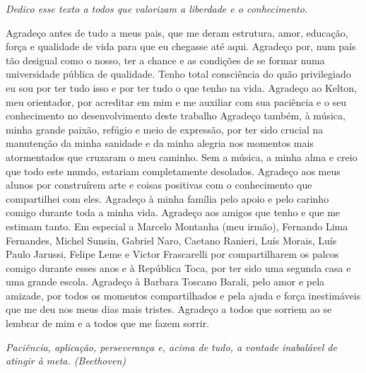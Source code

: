 \documentclass[
	12pt,				%
	openright,			%
	oneside,			%
	a4paper,			%
	english,			%
	french,				%
	spanish,			%
	brazil				%
	]{abntex2}
\begin{document}
\begin{dedicatoria}
   \vspace*{\fill}
   \begin{flushright}
   		\textit{Dedico esse texto a todos que valorizam a liberdade e o conhecimento.}
   \end{flushright}
\end{dedicatoria}

\begin{agradecimentos}
Agradeço antes de tudo a meus pais, que me deram estrutura, amor, educação,
força e qualidade de vida para que eu chegasse até aqui. Agradeço por, num país
tão desigual como o nosso, ter a chance e as condições de se formar numa
universidade pública de qualidade. Tenho total consciência do quão privilegiado
eu sou por ter tudo isso e por ter tudo o que tenho na vida. Agradeço ao Kelton,
meu orientador, por acreditar em mim e me auxiliar com sua paciência e o seu
conhecimento no desenvolvimento deste trabalho Agradeço também, à música, minha
grande paixão, refúgio e meio de expressão, por ter sido crucial na manutenção
da minha sanidade e da minha alegria nos momentos mais atormentados que cruzaram
o meu caminho. Sem a música, a minha alma e creio que todo este mundo, estariam
completamente desolados. Agradeço aos meus alunos por construírem arte e coisas
positivas com o conhecimento que compartilhei com eles. Agradeço à minha família
pelo apoio e pelo carinho comigo durante toda a minha vida. Agradeço aos amigos
que tenho e que me estimam tanto. Em especial a Marcelo Montanha (meu irmão),
Fernando Lima Fernandes, Michel Sunsin, Gabriel Naro, Caetano Ranieri, Luís
Morais, Luís Paulo Jarussi, Felipe Leme e Victor Frascarelli por compartilharem
os palcos comigo durante esses anos e à República Toca, por ter sido uma segunda
casa e uma grande escola. Agradeço à Barbara Toscano Barali, pelo amor e pela
amizade, por todos os momentos compartilhados e pela ajuda e força inestimáveis
que me deu nos meus dias mais tristes. Agradeço a todos que sorriem ao se
lembrar de mim e a todos que me fazem sorrir. \end{agradecimentos}

\begin{epigrafe}
    \vspace*{\fill}
	\begin{flushright}
		\textit{Paciência, aplicação, perseverança e, acima de tudo, a vontade inabalável de atingir à meta. (Beethoven)}
	\end{flushright}
\end{epigrafe}
\end{document}
